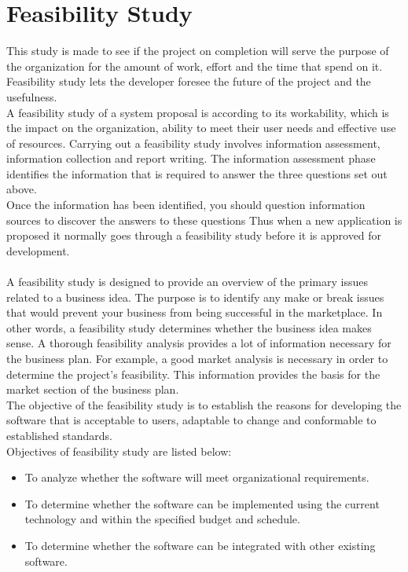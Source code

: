 
\section{Feasibility Study}
This study is made to see if the project on completion will serve the purpose of the organization for the amount of work, effort and the time that spend on it. Feasibility study lets the developer foresee the future of the project and the usefulness.\\
A feasibility study of a system proposal is according to its workability, which is the impact on the organization, ability to meet their user needs and effective use of resources. Carrying out a feasibility study involves information assessment, information collection and report writing. The information assessment phase identifies the information that is required to answer the three questions set out above.\\
Once the information has been identified, you should question information sources to discover the answers to these questions Thus when a new application is proposed it normally goes through a feasibility study before it is approved for development.\\\\
A feasibility study is designed to provide an overview of the primary issues related to a business idea. The purpose is to identify any make or break issues that would prevent your business from being successful in the marketplace. In other words, a feasibility study determines whether the business idea makes sense. A thorough feasibility analysis provides a lot of information necessary for the business plan. For example, a good market analysis is necessary in order to determine the project's feasibility. This information provides the basis for the market section of the business plan.\\
The objective of the feasibility study is to establish the reasons for developing the software that is acceptable to users, adaptable to change and conformable to established standards.\\
Objectives of feasibility study are listed below:
\begin{itemize}
	\item To analyze whether the software will meet organizational requirements.
	\item To determine whether the software can be implemented using the current technology and within the specified budget and schedule.
	\item To determine whether the software can be integrated with other existing software.
\end{itemize}

